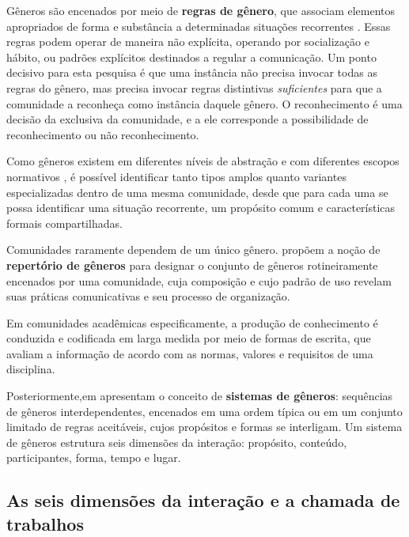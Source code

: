 Gêneros são encenados por meio de \textbf{regras de gênero}, que associam elementos apropriados de forma e substância a determinadas situações recorrentes \cite{GenresOrgComm}. Essas regras podem operar de maneira não explícita, operando por socialização e hábito, ou padrões explícitos destinados a regular a comunicação. Um ponto decisivo para esta pesquisa é que uma instância não precisa invocar todas as regras do gênero, mas precisa invocar regras distintivas \emph{suficientes} para que a comunidade a reconheça como instância daquele gênero. O reconhecimento é uma decisão da exclusiva da comunidade, e a ele corresponde a possibilidade de reconhecimento ou não reconhecimento.

Como gêneros existem em diferentes níveis de abstração e com diferentes escopos normativos \cite{GenresOrgComm}, é possível identificar tanto tipos amplos quanto variantes especializadas dentro de uma mesma comunidade, desde que para cada uma se possa identificar uma situação recorrente, um propósito comum e características formais compartilhadas. 

Comunidades raramente dependem de um único gênero. \citeauthor{GenreRepertoire} propõem a noção de \textbf{repertório de gêneros} para designar o conjunto de gêneros rotineiramente encenados por uma comunidade, cuja composição e cujo padrão de uso revelam suas práticas comunicativas e seu processo de organização. 

Em comunidades acadêmicas especificamente, a produção de conhecimento é conduzida e codificada em larga medida por meio de formas de escrita, que avaliam a informação de acordo com as normas, valores e requisitos de uma disciplina.

Posteriormente,em \cite{GenreSystems} apresentam o conceito de \textbf{sistemas de gêneros}: sequências de gêneros interdependentes, encenados em uma ordem típica ou em um conjunto limitado de regras aceitáveis, cujos propósitos e formas se interligam. Um sistema de gêneros estrutura seis dimensões da interação: propósito, conteúdo, participantes, forma, tempo e lugar.

\subsection{As seis dimensões da interação e a chamada de trabalhos}
\label{sec:seis-dimensoes}
 
